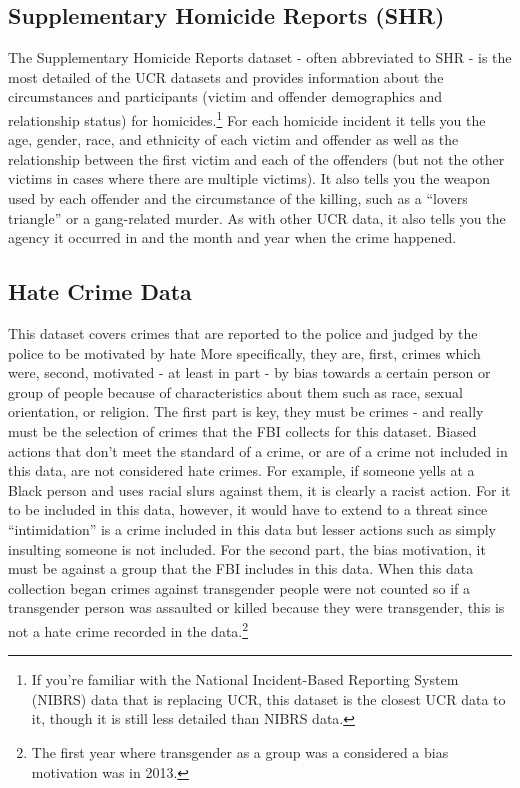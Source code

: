 \documentclass[
  12pt,
  openany]{book}
\begin{document}
\hypertarget{supplementary-homicide-reports-shr}{%
\subsection{Supplementary Homicide Reports (SHR)}\label{supplementary-homicide-reports-shr}}

The Supplementary Homicide Reports dataset - often abbreviated to SHR - is the most detailed of the UCR datasets and provides information about the circumstances and participants (victim and offender demographics and relationship status) for homicides.\footnote{If you're familiar with the National Incident-Based Reporting System (NIBRS) data that is replacing UCR, this dataset is the closest UCR data to it, though it is still less detailed than NIBRS data.} For each homicide incident it tells you the age, gender, race, and ethnicity of each victim and offender as well as the relationship between the first victim and each of the offenders (but not the other victims in cases where there are multiple victims). It also tells you the weapon used by each offender and the circumstance of the killing, such as a ``lovers triangle'' or a gang-related murder. As with other UCR data, it also tells you the agency it occurred in and the month and year when the crime happened.

\hypertarget{hate-crime-data}{%
\subsection{Hate Crime Data}\label{hate-crime-data}}

This dataset covers crimes that are reported to the police and judged by the police to be motivated by hate More specifically, they are, first, crimes which were, second, motivated - at least in part - by bias towards a certain person or group of people because of characteristics about them such as race, sexual orientation, or religion. The first part is key, they must be crimes - and really must be the selection of crimes that the FBI collects for this dataset. Biased actions that don't meet the standard of a crime, or are of a crime not included in this data, are not considered hate crimes. For example, if someone yells at a Black person and uses racial slurs against them, it is clearly a racist action. For it to be included in this data, however, it would have to extend to a threat since ``intimidation'' is a crime included in this data but lesser actions such as simply insulting someone is not included. For the second part, the bias motivation, it must be against a group that the FBI includes in this data. When this data collection began crimes against transgender people were not counted so if a transgender person was assaulted or killed because they were transgender, this is not a hate crime recorded in the data.\footnote{The first year where transgender as a group was a considered a bias motivation was in 2013.}
\end{document}

